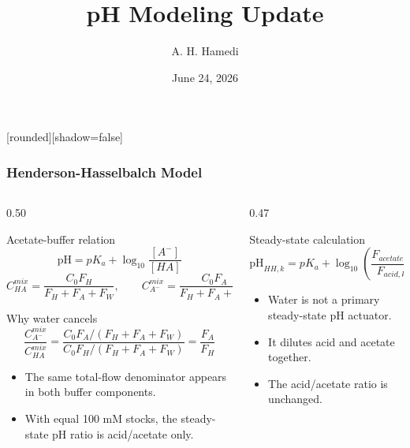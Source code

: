 \documentclass[aspectratio=169]{beamer}
\title[pH Supervisor Update]{pH Modeling Update}
\author[A. H. Hamedi]{A. H. Hamedi}
\date[June 2026]{June 24, 2026}
\newcommand{\FH}{F_H}
\newcommand{\FA}{F_A}
\newcommand{\FW}{F_W}
\newcommand{\pH}{\mathrm{pH}}
\begin{document}
\begin{frame}
[rounded][shadow=false]
\frametitle{\large \textbf{Henderson-Hasselbalch Model}}
\scriptsize

\vspace{-0.10cm}
\begin{columns}[T,onlytextwidth]
\begin{column}{0.50\textwidth}
\begin{block}{Acetate-buffer relation}
\vspace{-0.12cm}
\[
  \pH = pK_a+\log_{10}\frac{[A^-]}{[HA]}
\]
\vspace{-0.20cm}
\[
  C_{HA}^{mix}=\frac{C_0\FH}{\FH+\FA+\FW},
  \qquad
  C_{A^-}^{mix}=\frac{C_0\FA}{\FH+\FA+\FW}
\]
\vspace{-0.14cm}
\end{block}

\vspace{0.04cm}
\begin{block}{Why water cancels}
\vspace{-0.12cm}
\[
  \frac{C_{A^-}^{mix}}{C_{HA}^{mix}}
  =
  \frac{C_0\FA/(\FH+\FA+\FW)}
       {C_0\FH/(\FH+\FA+\FW)}
  =
  \frac{\FA}{\FH}
\]
\vspace{-0.10cm}
\begin{itemize}\raggedright
  \setlength\itemsep{0.35ex}
  \item The same total-flow denominator appears in both buffer components.
  \item With equal 100 mM stocks, the steady-state pH ratio is acid/acetate only.
\end{itemize}
\end{block}
\end{column}

\begin{column}{0.47\textwidth}
\begin{block}{Steady-state calculation}
\vspace{-0.10cm}
\[
  \pH_{HH,k}
  =
  pK_a+\log_{10}\left(
  \frac{F_{acetate,k}}{F_{acid,k}}
  \right)
\]
\vspace{-0.10cm}
\begin{itemize}\raggedright
  \setlength\itemsep{0.35ex}
  \item Water is not a primary steady-state pH actuator.
  \item It dilutes acid and acetate together.
  \item The acid/acetate ratio is unchanged.
\end{itemize}
\end{block}


\end{column}
\end{columns}
\end{frame}
\end{document}
